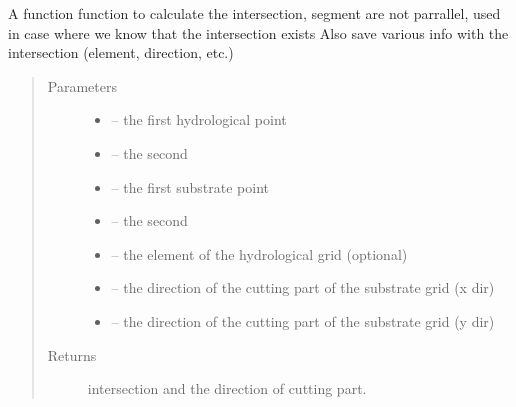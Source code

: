 \documentclass[letterpaper,10pt,english]{sphinxmanual}
\begin{document}
\begin{fulllineitems}
\label{\detokenize{index:src.substrate.intersec_cross}}
A function function to calculate the intersection, segment are not parrallel,
used in case where we know that the intersection exists
Also save various info with the intersection (element, direction, etc.)
\begin{quote}\begin{description}
\item[{Parameters}] \leavevmode\begin{itemize}
\item {} 
 -- the first hydrological point

\item {} 
 -- the second

\item {} 
 -- the first substrate point

\item {} 
 -- the second

\item {} 
 -- the element of the hydrological grid (optional)

\item {} 
 -- the direction of the cutting part of the substrate grid (x dir)

\item {} 
 -- the direction of the cutting part of the substrate grid (y dir)

\end{itemize}

\item[{Returns}] \leavevmode
intersection and the direction of cutting part.

\end{description}\end{quote}

\end{fulllineitems}

\end{document}
